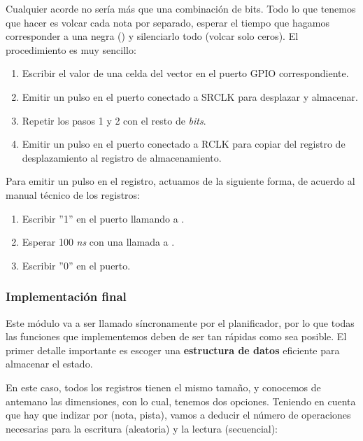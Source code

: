 \smallskip

Cualquier acorde no sería más que una combinación de bits. Todo lo que tenemos que hacer es volcar cada nota por separado, esperar el tiempo que hagamos corresponder a una negra (\quarternote) y silenciarlo todo (volcar solo ceros). El procedimiento es muy sencillo:

\begin{enumerate}
	\item Escribir el valor de una celda del vector en el puerto \acrshort{GPIO} correspondiente.
	\item Emitir un pulso en el puerto conectado a SRCLK para desplazar y almacenar.
	\item Repetir los pasos 1 y 2 con el resto de \textit{bits}.
	\item Emitir un pulso en el puerto conectado a RCLK para copiar del registro de desplazamiento al registro de almacenamiento.
\end{enumerate}

Para emitir un pulso en el registro, actuamos de la siguiente forma, de acuerdo al manual técnico de los registros:

\begin{enumerate}
	\item Escribir ''1'' en el puerto llamando a .
	\item Esperar 100 \textit{ns} con una llamada a .
	\item Escribir ''0'' en el puerto.
\end{enumerate}

\subsubsection{Implementación final}

Este módulo va a ser llamado síncronamente por el planificador, por lo que todas las funciones que implementemos deben de ser tan rápidas como sea posible. El primer detalle importante es escoger una \textbf{estructura de datos} eficiente para almacenar el estado.

En este caso, todos los registros tienen el mismo tamaño, y conocemos de antemano las dimensiones, con lo cual, tenemos dos opciones. Teniendo en cuenta que hay que indizar por (nota, pista), vamos a deducir el número de operaciones necesarias para la escritura (aleatoria) y la lectura (secuencial):

